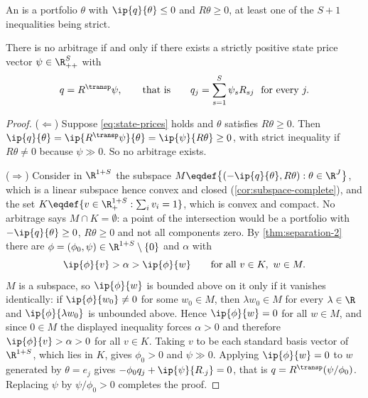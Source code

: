 \begin{definition}[Arbitrage]\label{def:arbitrage}
	An  is a portfolio $\theta$ with
	$\ip{q}{\theta}\leq0$ and $R\theta\geq0$, at least one of the $S+1$ inequalities
	being strict.
\end{definition}

\begin{theorem}\label{thm:ftap}
	There is no arbitrage if and only if there exists a strictly positive state
	price vector $\psi\in\R^S_{++}$ with
	\begin{equation}\label{eq:state-prices}
		q=R^{\transp}\psi,\qquad\text{that is}\qquad
		q_j=\sum_{s=1}^{S}\psi_sR_{sj}\ \ \text{for every }j .
	\end{equation}
\end{theorem}

\begin{proof}
	($\Leftarrow$) Suppose \eqref{eq:state-prices} holds and $\theta$ satisfies
	$R\theta\geq0$. Then
	$\ip{q}{\theta}=\ip{R^{\transp}\psi}{\theta}=\ip{\psi}{R\theta}\geq0$, with
	strict inequality if $R\theta\neq0$ because $\psi\gg0$. So no arbitrage exists.

	($\Rightarrow$) Consider in $\R^{1+S}$ the subspace
	$M\eqdef\bigl\{(-\ip{q}{\theta},R\theta) : \theta\in\R^J\bigr\}$, which is a
	linear subspace hence convex and closed
	(\autoref{cor:subspace-complete}), and the set
	$K\eqdef\{v\in\R^{1+S}_+ : \textstyle\sum_iv_i=1\}$, which is convex and
	compact. No arbitrage says $M\cap K=\emptyset$: a point of the intersection
	would be a portfolio with $-\ip{q}{\theta}\geq0$, $R\theta\geq0$ and not all
	components zero. By \autoref{thm:separation-2} there are
	$\phi=(\phi_0,\psi)\in\R^{1+S}\setminus\{0\}$ and $\alpha$ with
	\[
		\ip{\phi}{v}>\alpha>\ip{\phi}{w}\qquad\text{for all }v\in K,\ w\in M .
	\]
	$M$ is a subspace, so $\ip{\phi}{w}$ is bounded above on it only if it vanishes
	identically: if $\ip{\phi}{w_0}\neq0$ for some $w_0\in M$, then $\lambda w_0\in M$
	for every $\lambda\in\R$ and $\ip{\phi}{\lambda w_0}$ is unbounded above. Hence
	$\ip{\phi}{w}=0$ for all $w\in M$, and since $0\in M$ the displayed inequality
	forces $\alpha>0$ and therefore
	$\ip{\phi}{v}>\alpha>0$ for all $v\in K$. Taking $v$ to be each standard basis vector of
	$\R^{1+S}$, which lies in $K$, gives $\phi_0>0$ and $\psi\gg0$. Applying
	$\ip{\phi}{w}=0$ to $w$ generated by $\theta=e_j$ gives
	$-\phi_0q_j+\ip{\psi}{R_{\cdot j}}=0$, that is
	$q=R^{\transp}(\psi/\phi_0)$. Replacing $\psi$ by $\psi/\phi_0>0$ completes the
	proof.
\end{proof}

